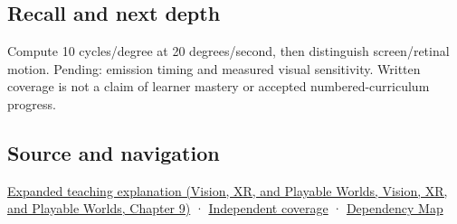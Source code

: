 \subsection{Recall and next depth}\label{appendix-70895739febb-recall-and-next-depth}

Compute 10 cycles/degree at 20 degrees/second, then distinguish screen/retinal motion. Pending: emission timing and measured visual sensitivity. Written coverage is not a claim of learner mastery or accepted numbered-curriculum progress.

\subsection{Source and navigation}\label{appendix-70895739febb-source-and-navigation}

\href{../07-Vision-XR-and-Playable-Worlds/main.pdf\#nameddest=04-visual-computing-ii-ch042-a-gaze-sample-needs-a-time-as-well-as-a-direction}{Expanded teaching explanation (Vision, XR, and Playable Worlds, Vision, XR, and Playable Worlds, Chapter 9)} · \hyperref[appendix-fd090d982a15-xr01---independent-seeing-and-representation-source]{Independent coverage} · \hyperref[appendix-4ad47bdd269a]{Dependency Map}
